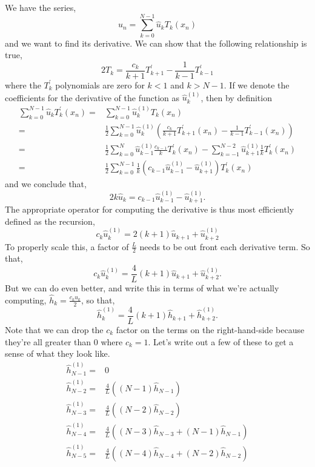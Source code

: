 \documentclass[11pt]{article}
\begin{document}
We have the series,
\begin{equation}
u_n=\sum_{k=0}^{N-1} \hat{u}_k T_k(x_n)
\end{equation}
and we want to find its derivative. We can show that the following relationship is true,
\begin{equation}
2 T_k = \frac{c_k}{k+1} T_{k+1}^\prime - \frac{1}{k-1} T_{k-1}^\prime
\end{equation}
where the $T_k^\prime$ polynomials are zero for $k<1$ and $k>N-1$. If we denote the coefficients for the derivative of the function as $\hat{u}_k^{(1)}$, then by definition
\begin{align}
 \sum_{k=0}^{N-1} \hat{u}_kT_k^\prime(x_n) =& \sum_{k=0}^{N-1} \hat{u}_k^{(1)} T_k(x_n) \\
 =& \frac{1}{2} \sum_{k=0}^{N-1} \hat{u}_k^{(1)} \left(\frac{c_k}{k+1} T_{k+1}^\prime(x_n) - \frac{1}{k-1} T_{k-1}^\prime(x_n) \right) \\
 =& \frac{1}{2} \sum_{k=0}^{N} \hat{u}_{k-1}^{(1)} \frac{c_{k-1}}{k} T_{k}^\prime(x_n) -  \sum_{k=-1}^{N-2} \hat{u}_{k+1}^{(1)} \frac{1}{k} T_{k}^\prime(x_n) \\
 =& \frac{1}{2} \sum_{k=0}^{N-1} \frac{1}{k} \left( c_{k-1} \hat{u}_{k-1}^{(1)} -  \hat{u}_{k+1}^{(1)} \right) T_{k}^\prime(x_n) 
\end{align}
and we conclude that,
\begin{equation}
2 k \hat{u}_k = c_{k-1} \hat{u}_{k-1}^{(1)} -  \hat{u}_{k+1}^{(1)}.
\end{equation}
The appropriate operator for computing the derivative is thus most efficiently defined as the recursion,
\begin{equation}
c_{k} \hat{u}_{k}^{(1)} = 2 (k+1) \hat{u}_{k+1} + \hat{u}_{k+2}^{(1)}
\end{equation}
To properly scale this, a factor of $\frac{L}{2}$ needs to be out front each derivative term. So that,
\begin{equation}
c_{k} \hat{u}_{k}^{(1)} = \frac{4}{L} (k+1) \hat{u}_{k+1} + \hat{u}_{k+2}^{(1)}.
\end{equation}
But we can do even better, and write this in terms of what we're actually computing, $\hat{h}_k = \frac{c_k \hat{u}_k}{2}$, so that,
\begin{equation}
\hat{h}_{k}^{(1)} = \frac{4}{L} (k+1) \hat{h}_{k+1} + \hat{h}_{k+2}^{(1)}.
\end{equation}
Note that we can drop the $c_k$ factor on the terms on the right-hand-side because they're all greater than $0$ where $c_k=1$. Let's write out a few of these to get a sense of what they look like.
\begin{align}
\hat{h}_{N-1}^{(1)} =& 0 \\
\hat{h}_{N-2}^{(1)} =& \frac{4}{L} \left(  (N-1) \hat{h}_{N-1} \right) \\
\hat{h}_{N-3}^{(1)} =& \frac{4}{L} \left(  (N-2) \hat{h}_{N-2} \right) \\
\hat{h}_{N-4}^{(1)} =& \frac{4}{L} \left(  (N-3) \hat{h}_{N-3} +  (N-1) \hat{h}_{N-1} \right) \\
\hat{h}_{N-5}^{(1)} =& \frac{4}{L} \left(  (N-4) \hat{h}_{N-4} + (N-2) \hat{h}_{N-2} \right) 
\end{align}
\end{document}
